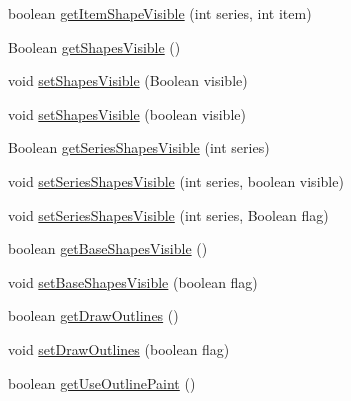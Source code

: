 \begin{DoxyCompactItemize}
\item 
boolean \mbox{\hyperlink{classorg_1_1jfree_1_1chart_1_1renderer_1_1category_1_1_line_and_shape_renderer_a3011b9b5d80850efecaa3c67c9f220a7}{get\+Item\+Shape\+Visible}} (int series, int item)
\item 
Boolean \mbox{\hyperlink{classorg_1_1jfree_1_1chart_1_1renderer_1_1category_1_1_line_and_shape_renderer_a1b2c53ae8be56288c260b6da6fec348b}{get\+Shapes\+Visible}} ()
\item 
void \mbox{\hyperlink{classorg_1_1jfree_1_1chart_1_1renderer_1_1category_1_1_line_and_shape_renderer_a478523c511be1a42589ca7ada236d335}{set\+Shapes\+Visible}} (Boolean visible)
\item 
void \mbox{\hyperlink{classorg_1_1jfree_1_1chart_1_1renderer_1_1category_1_1_line_and_shape_renderer_a0554bd98df3546cff06ae18da5204e9a}{set\+Shapes\+Visible}} (boolean visible)
\item 
Boolean \mbox{\hyperlink{classorg_1_1jfree_1_1chart_1_1renderer_1_1category_1_1_line_and_shape_renderer_af607c5d82294d4f53fb28935994c715d}{get\+Series\+Shapes\+Visible}} (int series)
\item 
void \mbox{\hyperlink{classorg_1_1jfree_1_1chart_1_1renderer_1_1category_1_1_line_and_shape_renderer_a36343c43ec265041cd96c7589561f486}{set\+Series\+Shapes\+Visible}} (int series, boolean visible)
\item 
void \mbox{\hyperlink{classorg_1_1jfree_1_1chart_1_1renderer_1_1category_1_1_line_and_shape_renderer_a77e7ca8fcc0d5662e3430a7ea6232afb}{set\+Series\+Shapes\+Visible}} (int series, Boolean flag)
\item 
boolean \mbox{\hyperlink{classorg_1_1jfree_1_1chart_1_1renderer_1_1category_1_1_line_and_shape_renderer_a2f676208b847d3847162f57419493426}{get\+Base\+Shapes\+Visible}} ()
\item 
void \mbox{\hyperlink{classorg_1_1jfree_1_1chart_1_1renderer_1_1category_1_1_line_and_shape_renderer_afe46101c6cfb30fc225daaabe2899e9a}{set\+Base\+Shapes\+Visible}} (boolean flag)
\item 
boolean \mbox{\hyperlink{classorg_1_1jfree_1_1chart_1_1renderer_1_1category_1_1_line_and_shape_renderer_a8df36d56b702ac3e0f4a912c31f02266}{get\+Draw\+Outlines}} ()
\item 
void \mbox{\hyperlink{classorg_1_1jfree_1_1chart_1_1renderer_1_1category_1_1_line_and_shape_renderer_a1b3c114bea540187635abc402b024a66}{set\+Draw\+Outlines}} (boolean flag)
\item 
boolean \mbox{\hyperlink{classorg_1_1jfree_1_1chart_1_1renderer_1_1category_1_1_line_and_shape_renderer_aa23a1600374c274ce77436ef383923ea}{get\+Use\+Outline\+Paint}} ()

\end{DoxyCompactItemize}
